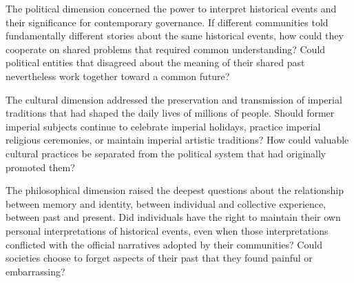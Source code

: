 The political dimension concerned the power to interpret historical
events and their significance for contemporary governance. If different
communities told fundamentally different stories about the same
historical events, how could they cooperate on shared problems that
required common understanding? Could political entities that disagreed
about the meaning of their shared past nevertheless work together toward
a common future?

The cultural dimension addressed the preservation and transmission of
imperial traditions that had shaped the daily lives of millions of
people. Should former imperial subjects continue to celebrate imperial
holidays, practice imperial religious ceremonies, or maintain imperial
artistic traditions? How could valuable cultural practices be separated
from the political system that had originally promoted them?

The philosophical dimension raised the deepest questions about the
relationship between memory and identity, between individual and
collective experience, between past and present. Did individuals have
the right to maintain their own personal interpretations of historical
events, even when those interpretations conflicted with the official
narratives adopted by their communities? Could societies choose to
forget aspects of their past that they found painful or embarrassing?

